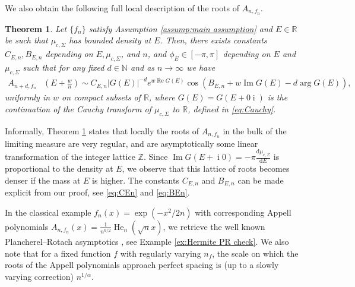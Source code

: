 \documentclass[reqno]{amsart}
\newcommand{\1}{\mathbf{1}}
\DeclareMathOperator{\He}{He}
\newcommand{\dd}{\mathrm{d}}
\DeclareMathOperator{\ii}{i}
\renewcommand\Re{\operatorname{Re}}
\renewcommand\Im{\operatorname{Im}}
\newcommand{\R}{\mathbb{R}}
\newcommand{\N}{\mathbb{N}}
\newcommand{\Z}{\mathbb{Z}}
\def\R{\mathbb{R}}
\theoremstyle{plain}
\newtheorem{theorem}{Theorem}[section]
\newtheorem{corollary}[theorem]{Corollary}
\theoremstyle{definition}
\theoremstyle{remark}
\numberwithin{equation}{section}
\begin{document}
We also obtain the following full local description of the roots of $A_{n,f_n}$.

\begin{theorem}\label{thm:local spacing}
	Let $\{f_n\}$ satisfy  Assumption \ref{assump:main assumption} and $E\in\R$ be such that $\mu_{c,\Sigma}$ has bounded density at $E$. Then, there exists constants $C_{E,n},B_{E,n}$ depending on $E,\mu_{c,\Sigma}$, and $n$, and $\phi_E\in [-\pi,\pi]$ depending on $E$ and $\mu_{c,\Sigma}$ such that for any fixed $d\in\N$ and as $n\to\infty$ we have \begin{align*}
		A_{n+d,f_n}&\left(E+\frac{w}{n}\right) \sim C_{E,n}|G(E)|^{-d}e^{w\Re G(E)}\cos\left(B_{E,n}+w\Im G(E)-d\arg G(E)\right) , 
	\end{align*} uniformly in $w$ on compact subsets of $\R$, where $G(E)=G(E+0\ii)$ is the continuation of the Cauchy transform of $\mu_{c,\Sigma}$ to $\R$, defined in \eqref{eq:Cauchy}.
\end{theorem}
Informally, Theorem \ref{thm:local spacing} states that locally the roots of $A_{n,f_n}$ in the bulk of the limiting measure are very regular, and are asymptotically some linear transformation of the integer lattice $\Z$. Since $\Im G (E+\ii0)=-\pi \frac{\dd\mu_{c,\Sigma}}{\dd E}$ is proportional to the density at $E$, we observe that this lattice of roots becomes denser if the mass at $E$ is higher.	
The constants $C_{E,n}$ and $B_{E,n}$ can be made explicit from our proof, see \eqref{eq:CEn} and \eqref{eq:BEn}.

In the classical example $f_n(x)=\exp(-x^2/2n)$ with corresponding Appell polynomials $A_{n,f_n}(x)=\frac{1}{n^{n/2}}\He_n(\sqrt n x )$, we retrieve the well known Plancherel–Rotach asymptotics \cite{NIST:DLMF}, see Example \ref{ex:Hermite PR check}. We also note that for a fixed function $f$ with regularly varying $n_f$, the scale on which the roots of the Appell polynomials approach perfect spacing is (up to a slowly varying correction) $n^{1/\alpha}$.


\end{document}
